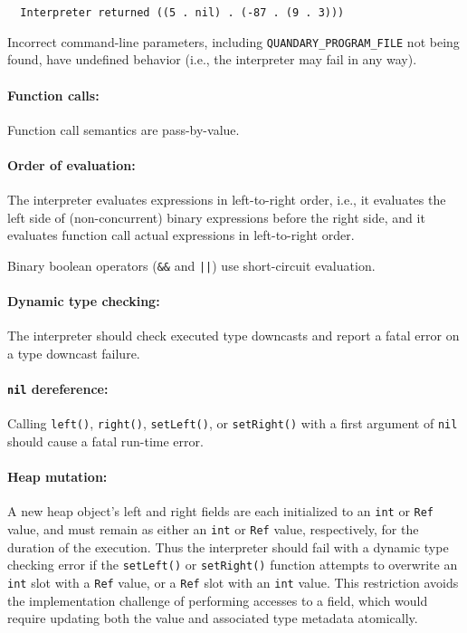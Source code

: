 \documentclass[10pt]{article}
\newcommand{\tm}[1]{\texttt{#1}}
\begin{document}
\begin{verbatim}
  Interpreter returned ((5 . nil) . (-87 . (9 . 3)))
\end{verbatim}
Incorrect command-line parameters, including \texttt{QUANDARY\_PROGRAM\_FILE} not being found,
have undefined behavior (i.e., the interpreter may fail in any way).

\paragraph{Function calls:}

Function call semantics are pass-by-value.

\paragraph{Order of evaluation:}

The interpreter evaluates expressions in left-to-right order, i.e.,
it evaluates the left side of (non-concurrent) binary expressions before the right side,
and it evaluates function call actual expressions in left-to-right order.

Binary boolean operators (\tm{\&\&} and \tm{||}) use short-circuit evaluation.

\paragraph{Dynamic type checking:}

The interpreter should check executed type downcasts and report a fatal error
on a type downcast failure.

\paragraph{\tm{nil} dereference:}

Calling \tm{left()}, \tm{right()}, \tm{setLeft()}, or \tm{setRight()}
with a first argument of \tm{nil} should cause a fatal run-time error.

\paragraph{Heap mutation:}

A new heap object's left and right fields are each initialized to
an \tm{int} or \tm{Ref} value,
and must remain as either an \tm{int} or \tm{Ref} value, respectively,
for the duration of the execution.
Thus the interpreter should fail with a dynamic type checking error if
the \tm{setLeft()} or \tm{setRight()} function
attempts to overwrite an \tm{int} slot with a \tm{Ref} value,
or a \tm{Ref} slot with an \tm{int} value.
This restriction avoids the implementation challenge of performing accesses
to a field, which would require updating both the value and associated type metadata atomically.
\end{document}
